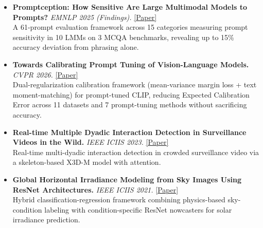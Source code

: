 \documentclass[10pt]{article}
\begin{document}
\begin{itemize}
    \item \textbf{Promptception: How Sensitive Are Large Multimodal Models to Prompts?} \textit{EMNLP 2025 (Findings).} \href{https://aclanthology.org/2025.findings-emnlp.1302.pdf}{[\textcolor{linkblue}{Paper}]} \\ A 61-prompt evaluation framework across 15 categories measuring prompt sensitivity in 10 LMMs on 3 MCQA benchmarks, revealing up to 15\% accuracy deviation from phrasing alone.
    \item \textbf{Towards Calibrating Prompt Tuning of Vision-Language Models.} \textit{CVPR 2026.} \href{https://arxiv.org/pdf/2602.19024}{[\textcolor{linkblue}{Paper}]} \\ Dual-regularization calibration framework (mean-variance margin loss + text moment-matching) for prompt-tuned CLIP, reducing Expected Calibration Error across 11 datasets and 7 prompt-tuning methods without sacrificing accuracy.
    \item \textbf{Real-time Multiple Dyadic Interaction Detection in Surveillance Videos in the Wild.} \textit{IEEE ICIIS 2023.} \href{https://ieeexplore.ieee.org/document/10253565}{[\textcolor{linkblue}{Paper}]} \\ Real-time multi-dyadic interaction detection in crowded surveillance video via a skeleton-based X3D-M model with attention.
    \item \textbf{Global Horizontal Irradiance Modeling from Sky Images Using ResNet Architectures.} \textit{IEEE ICIIS 2021.} \href{https://ieeexplore.ieee.org/document/9660664}{[\textcolor{linkblue}{Paper}]} \\ Hybrid classification-regression framework combining physics-based sky-condition labeling with condition-specific ResNet nowcasters for solar irradiance prediction.
\end{itemize}

\end{document}
